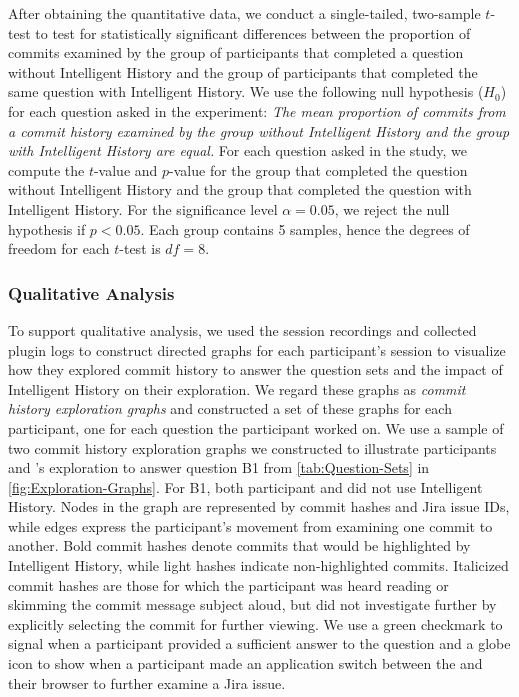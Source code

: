 After obtaining the quantitative data, we conduct a single-tailed, two-sample $t$-test to test for statistically significant differences 
between the proportion of commits examined by the group of participants that completed a question without Intelligent History and the group of participants 
that completed the same question with Intelligent History.
We use the following null hypothesis ($H_{0}$) for each question asked in the experiment: 
\textit{The mean proportion of commits from a commit history examined by the group without Intelligent History and the group with Intelligent History are equal.}
For each question asked in the study, we compute the $t$-value and $p$-value for the group that completed 
the question without Intelligent History and the group that completed the question with Intelligent History.
For the significance level $\alpha = 0.05$, we reject the null hypothesis if $p < 0.05$.
Each group contains 5 samples, hence the degrees of freedom for each $t$-test is $df = 8$.

\subsubsection{Qualitative Analysis}

To support qualitative analysis, we used the session recordings and collected plugin logs to construct directed graphs 
for each participant's session to visualize how they explored commit history to answer the question sets 
and the impact of Intelligent History on their exploration.
We regard these graphs as \emph{commit history exploration graphs} and constructed a set of these graphs for each participant, 
one for each question the participant worked on.
We use a sample of two commit history exploration graphs we constructed to illustrate 
participants  and ’s exploration to answer question B1 
from \autoref{tab:Question-Sets} in \autoref{fig:Exploration-Graphs}.
For B1, both participant  and  did not use Intelligent History.
Nodes in the graph are represented by commit hashes and Jira issue IDs, 
while edges express the participant's movement from examining one commit to another.
Bold commit hashes denote commits that would be highlighted by Intelligent History, 
while light hashes indicate non-highlighted commits.
Italicized commit hashes are those for which the participant was heard reading or skimming the commit message subject aloud, 
but did not investigate further by explicitly selecting the commit for further viewing.
We use a green checkmark to signal when a participant provided a sufficient answer to the question 
and a globe icon to show when a participant made an application switch between the  
and their browser to further examine a Jira issue.

